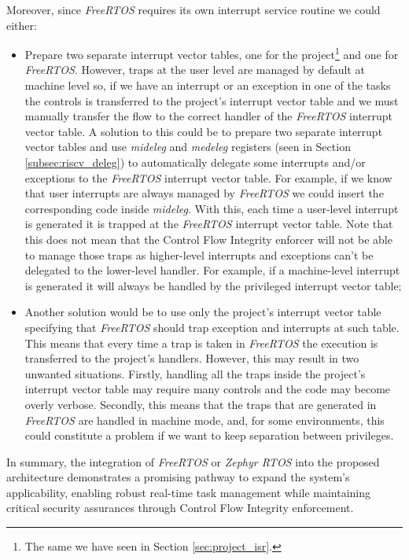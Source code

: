 Moreover, since \textit{FreeRTOS} requires its own interrupt service routine we could
either:
\begin{itemize}
  \item Prepare two separate interrupt vector tables, one for the project\footnote{The
    same we have seen in Section \ref{sec:project_isr}.} and one for \textit{FreeRTOS}.
    However, traps at the user level are managed by default at machine level so,
    if we have an interrupt or an exception in one of the tasks the controls is transferred
    to the project's interrupt vector table and we must manually transfer the flow
    to the correct handler of the \textit{FreeRTOS} interrupt vector table. A solution
    to this could be to prepare two separate interrupt vector tables and use \textit{mideleg}
    and \textit{medeleg} registers (seen in Section \ref{subsec:riscv_deleg}) to
    automatically delegate some interrupts and/or exceptions to the \textit{FreeRTOS}
    interrupt vector table. For example, if we know that user interrupts are
    always managed by \textit{FreeRTOS} we could insert the corresponding code inside
    \textit{mideleg}. With this, each time a user-level interrupt is generated
    it is trapped at the \textit{FreeRTOS} interrupt vector table. Note that
    this does not mean that the Control Flow Integrity enforcer will not be able
    to manage those traps as higher-level interrupts and exceptions can't be
    delegated to the lower-level handler. For example, if a machine-level
    interrupt is generated it will always be handled by the privileged interrupt
    vector table;

  \item Another solution would be to use only the project's interrupt vector table
    specifying that \textit{FreeRTOS} should trap exception and interrupts at
    such table. This means that every time a trap is taken in \textit{FreeRTOS}
    the execution is transferred to the project's handlers. However, this may
    result in two unwanted situations. Firstly, handling all the traps inside
    the project's interrupt vector table may require many controls and the code
    may become overly verbose. Secondly, this means that the traps that are
    generated in \textit{FreeRTOS} are handled in machine mode, and, for some environments,
    this could constitute a problem if we want to keep separation between
    privileges.
\end{itemize}

In summary, the integration of \textit{FreeRTOS} or \textit{Zephyr RTOS} into
the proposed architecture demonstrates a promising pathway to expand the system's
applicability, enabling robust real-time task management while maintaining critical
security assurances through Control Flow Integrity enforcement.

